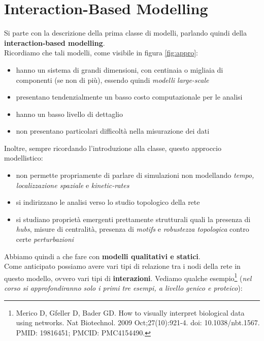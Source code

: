 \documentclass[a4paper,12pt, oneside]{book}
\begin{document}
\chapter{Interaction-Based Modelling}
Si parte con la descrizione della prima classe di modelli, parlando quindi della
\textbf{interaction-based modelling}.\\
Ricordiamo che tali modelli, come visibile in figura \ref{fig:appro}:
\begin{itemize}
  \item hanno un sistema di grandi dimensioni, con centinaia o migliaia di
  componenti (se non di più),
  essendo quindi \textit{modelli large-scale}
  \item presentano tendenzialmente un basso costo computazionale per le analisi
  \item hanno un basso livello di dettaglio
  \item non presentano particolari difficoltà nella misurazione dei dati
\end{itemize}
Inoltre, sempre ricordando l'introduzione alla classe, questo approccio
modellistico:
\begin{itemize}
  \item non permette propriamente di parlare di simulazioni non modellando
  \textit{tempo, localizzazione spaziale} e \textit{kinetic-rates} 
  \item si indirizzano le analisi verso lo studio topologico della rete
  \item si studiano proprietà emergenti prettamente strutturali quali la
  presenza di \textit{hubs}, misure di centralità, presenza di \textit{motifs} e
  \textit{robustezza topologica} contro certe \textit{perturbazioni}
\end{itemize}
Abbiamo quindi a che fare con \textbf{modelli qualitativi e statici}.\\
Come anticipato possiamo avere vari tipi di relazione tra i nodi della rete in
questo modello, ovvero vari tipi di \textbf{interazioni}.
\newpage
\noindent
Vediamo qualche
esempio\footnote{Merico D, Gfeller D, Bader GD. How to visually interpret
  biological data using networks. Nat Biotechnol. 2009 Oct;27(10):921-4. doi:
  10.1038/nbt.1567. PMID: 19816451; PMCID: PMC4154490.} (\textit{nel corso si
  approfondiranno solo i primi tre esempi, a livello genico e proteico}): 
\end{document}

